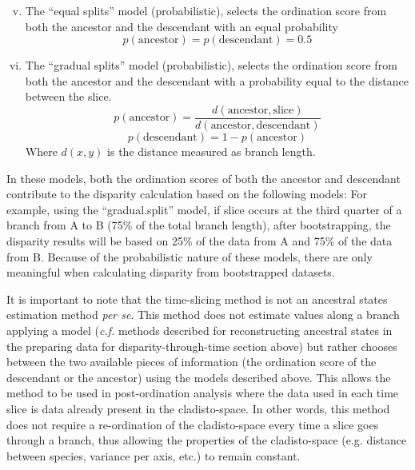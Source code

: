 \documentclass[12pt,a4paper]{article}
\begin{document}
\begin{enumerate}
    \begin{enumerate}[(i)]
    \setcounter{enumii}{4}
      \item The ``equal splits'' model (probabilistic), selects the ordination score from both the ancestor and the descendant with an equal probability
          \begin{equation}
          p(\text{ancestor}) = p(\text{descendant}) = 0.5
          \end{equation}

    \item The ``gradual splits'' model (probabilistic), selects the ordination score from both the ancestor and the descendant with a probability equal to the distance between the slice.
          \begin{equation}
              p(\text{ancestor}) = \frac{d(\text{ancestor},\text{slice})}{d(\text{ancestor},\text{descendant})}
          \end{equation}
          \begin{equation}
              p(\text{descendant}) = 1 - p(\text{ancestor})
          \end{equation}
    \noindent Where $d(x,y)$ is the distance measured as branch length.
    \end{enumerate}

    In these models, both the ordination scores of both the ancestor and descendant contribute to the disparity calculation based on the following models:
    For example, using the ``gradual.split'' model, if slice occurs at the third quarter of a branch from A to B (75\% of the total branch length), after bootstrapping, the disparity results will be based on 25\% of the data from A and 75\% of the data from B.
    Because of the probabilistic nature of these models, there are only meaningful when calculating disparity from bootstrapped datasets.
\end{enumerate}

It is important to note that the time-slicing method is not an ancestral states estimation method \textit{per se}.
This method does not estimate values along a branch applying a model (\textit{c.f.} methods described for reconstructing ancestral states in the preparing data for disparity-through-time section above) but rather chooses between the two available pieces of information (the ordination score of the descendant or the ancestor) using the models described above.
This allows the method to be used in post-ordination analysis where the data used in each time slice is data already present in the cladisto-space.
In other words, this method does not require a re-ordination of the cladisto-space every time a slice goes through a branch, thus allowing the properties of the cladisto-space (e.g. distance between species, variance per axis, etc.) to remain constant.
\end{document}
